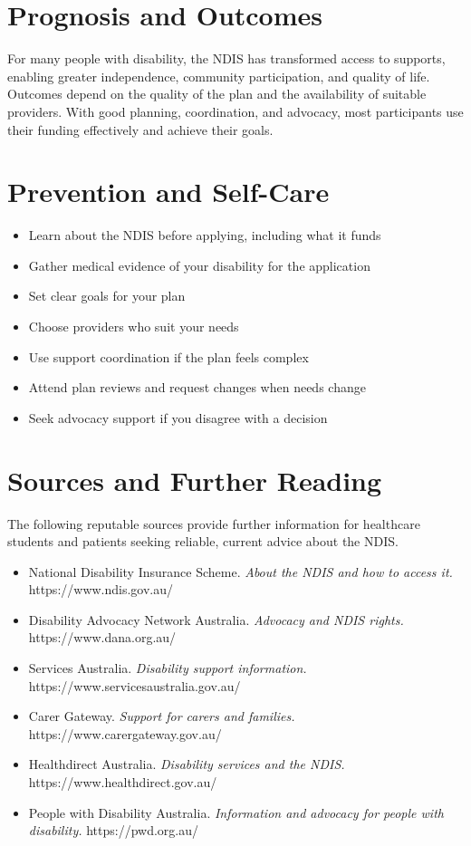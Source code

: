 \section*{Prognosis and Outcomes}
For many people with disability, the NDIS has transformed access to supports, enabling greater independence, community participation, and quality of life. Outcomes depend on the quality of the plan and the availability of suitable providers. With good planning, coordination, and advocacy, most participants use their funding effectively and achieve their goals.

\section*{Prevention and Self-Care}
\begin{itemize}
    \item Learn about the NDIS before applying, including what it funds
    \item Gather medical evidence of your disability for the application
    \item Set clear goals for your plan
    \item Choose providers who suit your needs
    \item Use support coordination if the plan feels complex
    \item Attend plan reviews and request changes when needs change
    \item Seek advocacy support if you disagree with a decision
\end{itemize}

\section*{Sources and Further Reading}
The following reputable sources provide further information for healthcare students and patients seeking reliable, current advice about the NDIS.

\begin{itemize}
    \item National Disability Insurance Scheme. \textit{About the NDIS and how to access it.} https://www.ndis.gov.au/
    \item Disability Advocacy Network Australia. \textit{Advocacy and NDIS rights.} https://www.dana.org.au/
    \item Services Australia. \textit{Disability support information.} https://www.servicesaustralia.gov.au/
    \item Carer Gateway. \textit{Support for carers and families.} https://www.carergateway.gov.au/
    \item Healthdirect Australia. \textit{Disability services and the NDIS.} https://www.healthdirect.gov.au/
    \item People with Disability Australia. \textit{Information and advocacy for people with disability.} https://pwd.org.au/
\end{itemize}
